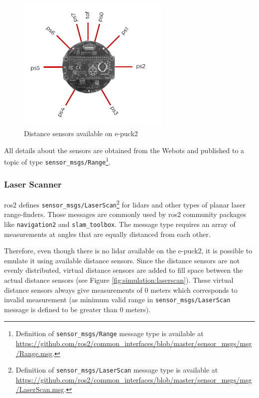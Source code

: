 \begin{figure}[H]
    \centering
    \includegraphics[width=0.65\textwidth]{simulation/figures/distance_sensors.pdf}
    \caption{Distance sensors available on e-puck2}
    \label{fig:simulation:distance_sensors}
\end{figure}

All details about the sensors are obtained from the Webots and published to a topic of type \texttt{sensor\_msgs/Range}\footnote{Definition of \texttt{sensor\_msgs/Range} message type is available at \url{https://github.com/ros2/common_interfaces/blob/master/sensor_msgs/msg/Range.msg}.}.

\subsubsection{Laser Scanner}
\ac{ros2} defines \texttt{sensor\_msgs/LaserScan}\footnote{Definition of \texttt{sensor\_msgs/LaserScan} message type is available at \url{https://github.com/ros2/common_interfaces/blob/master/sensor_msgs/msg/LaserScan.msg}.} for \acp{lidar} and other types of planar laser range-finders.
Those messages are commonly used by \ac{ros2} community packages like \texttt{navigation2} and \texttt{slam\_toolbox}.
The message type requires an array of measurements at angles that are equally distanced from each other. 

Therefore, even though there is no \ac{lidar} available on the e-puck2, it is possible to emulate it using available distance sensors.
Since the distance sensors are not evenly distributed, virtual distance sensors are added to fill space between the actual distance sensors (see Figure \ref{fig:simulation:laserscan}).
These virtual distance sensors always give measurements of 0 meters which corresponds to invalid measurement (as minimum valid range in \texttt{sensor\_msgs/LaserScan} message is defined to be greater than 0 meters).

